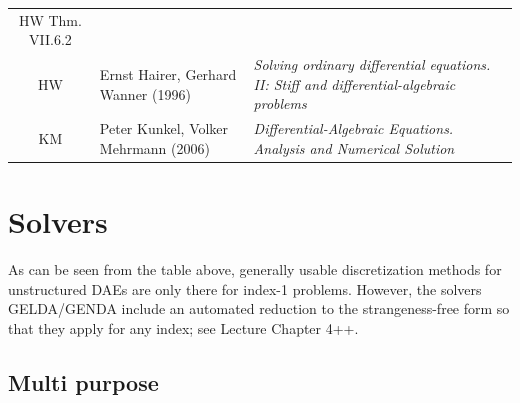 \documentclass[]{book}
\theoremstyle{definition}
\theoremstyle{definition}
\theoremstyle{definition}
\theoremstyle{definition}
\theoremstyle{remark}
\begin{document}
\begin{longtable}[]{@{}cll@{}}
\begin{minipage}[t]{0.42\columnwidth}
HW Thm. VII.6.2\strut
\end{minipage}\tabularnewline
\begin{minipage}[t]{0.04\columnwidth}\centering
HW\strut
\end{minipage} & \begin{minipage}[t]{0.45\columnwidth}\raggedright
Ernst Hairer, Gerhard Wanner (1996)\strut
\end{minipage} & \begin{minipage}[t]{0.42\columnwidth}\raggedright
\emph{Solving ordinary differential equations. II: Stiff and differential-algebraic problems}\strut
\end{minipage}\tabularnewline
\begin{minipage}[t]{0.04\columnwidth}\centering
KM\strut
\end{minipage} & \begin{minipage}[t]{0.45\columnwidth}\raggedright
Peter Kunkel, Volker Mehrmann (2006)\strut
\end{minipage} & \begin{minipage}[t]{0.42\columnwidth}\raggedright
\emph{Differential-Algebraic Equations. Analysis and Numerical Solution}\strut
\end{minipage}\tabularnewline
\bottomrule
\end{longtable}

\hypertarget{solvers}{%
\section{Solvers}\label{solvers}}

As can be seen from the table above, generally usable discretization methods for unstructured DAEs are only there for index-1 problems. However, the solvers GELDA/GENDA include an automated reduction to the strangeness-free form so that they apply for any index; see Lecture Chapter 4++.

\hypertarget{multi-purpose}{%
\subsection{Multi purpose}\label{multi-purpose}}
\end{document}
